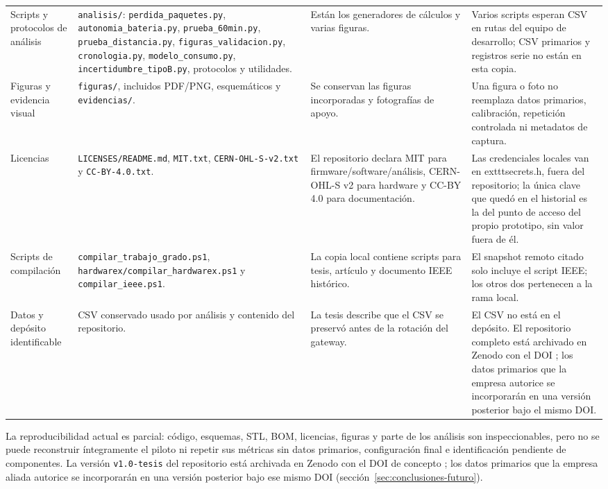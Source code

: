 \begin{longtable}{@{}>{\raggedright\arraybackslash}p{2.4cm}>{\raggedright\arraybackslash}p{4.9cm}>{\raggedright\arraybackslash}p{3.9cm}>{\raggedright\arraybackslash}p{3.4cm}@{}}
Scripts y protocolos de análisis & \texttt{analisis/}: \texttt{perdida\_paquetes.py}, \texttt{autonomia\_bateria.py}, \texttt{prueba\_60min.py}, \texttt{prueba\_distancia.py}, \texttt{figuras\_validacion.py}, \texttt{cronologia.py}, \texttt{modelo\_consumo.py}, \texttt{incertidumbre\_tipoB.py}, protocolos y utilidades. & Están los generadores de cálculos y varias figuras. & Varios scripts esperan CSV en rutas del equipo de desarrollo; CSV primarios y registros serie no están en esta copia. \\
Figuras y evidencia visual & \texttt{figuras/}, incluidos PDF/PNG, esquemáticos y \texttt{evidencias/}. & Se conservan las figuras incorporadas y fotografías de apoyo. & Una figura o foto no reemplaza datos primarios, calibración, repetición controlada ni metadatos de captura. \\
Licencias & \texttt{LICENSES/README.md}, \texttt{MIT.txt}, \texttt{CERN-OHL-S-v2.txt} y \texttt{CC-BY-4.0.txt}. & El repositorio declara MIT para firmware/software/análisis, CERN-OHL-S v2 para hardware y CC-BY 4.0 para documentación. & Las credenciales locales van en 	exttt{secrets.h}, fuera del repositorio; la única clave que quedó en el historial es la del punto de acceso del propio prototipo, sin valor fuera de él. \\
Scripts de compilación & \texttt{compilar\_trabajo\_grado.ps1}, \texttt{hardwarex/}\linebreak\texttt{compilar\_hardwarex.ps1} y \texttt{compilar\_ieee.ps1}. & La copia local contiene scripts para tesis, artículo y documento IEEE histórico. & El snapshot remoto citado solo incluye el script IEEE; los otros dos pertenecen a la rama local. \\
Datos y depósito identificable & CSV conservado usado por análisis y contenido del repositorio. & La tesis describe que el CSV se preservó antes de la rotación del gateway. & El CSV no está en el depósito. El repositorio completo está archivado en Zenodo con el DOI \DOIZenodo{}; los datos primarios que la empresa autorice se incorporarán en una versión posterior bajo el mismo DOI. \\
\end{longtable}
\endgroup

La reproducibilidad actual es parcial: código, esquemas, STL, BOM, licencias, figuras y parte de los análisis son inspeccionables, pero no se puede reconstruir íntegramente el piloto ni repetir sus métricas sin datos primarios, configuración final e identificación pendiente de componentes. La versión \texttt{v1.0-tesis} del repositorio está archivada en Zenodo con el DOI de concepto \DOIZenodo{}; los datos primarios que la empresa aliada autorice se incorporarán en una versión posterior bajo ese mismo DOI (sección~\ref{sec:conclusiones-futuro}).

